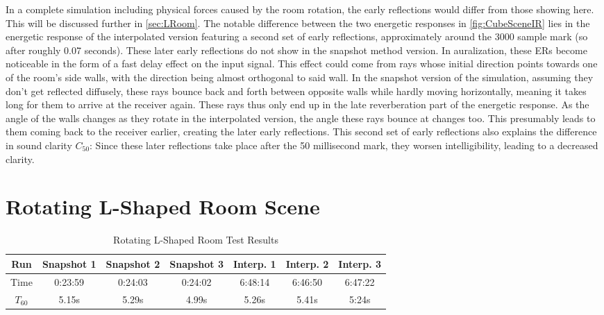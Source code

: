 In a complete simulation including physical forces caused by the room rotation,
the early reflections would differ from those showing here.
This will be discussed further in \autoref{sec:LRoom}.
\newline
The notable difference between the two energetic responses in \autoref{fig:CubeSceneIR}
lies in the energetic response of the interpolated version featuring a second set of early reflections,
approximately around the 3000 sample mark (so after roughly 0.07 seconds).
These later early reflections do not show in the snapshot method version.
In auralization, these ERs become noticeable in the form of a fast delay effect on the input signal.
\newline
This effect could come from rays whose initial direction points towards one of the room's side walls,
with the direction being almost orthogonal to said wall.
In the snapshot version of the simulation, assuming they don't get reflected diffusely,
these rays bounce back and forth between opposite walls while hardly moving horizontally,
meaning it takes long for them to arrive at the receiver again.
These rays thus only end up in the late reverberation part of the energetic response.
\newline
As the angle of the walls changes as they rotate in the interpolated version,
the angle these rays bounce at changes too.
This presumably leads to them coming back to the receiver earlier, creating the later early reflections.
\newline
This second set of early reflections also explains the difference in sound clarity \(C_{50}\):
Since these later reflections take place after the 50 millisecond mark,
they worsen intelligibility, leading to a decreased clarity.

\section{Rotating L-Shaped Room Scene}\label{sec:LRoom}

\begin{table}[t!]
    \centering
    \begin{tabular}{| c | c | c | c | c | c | c |}
        \hline
        Run        & Snapshot 1 & Snapshot 2 & Snapshot 3 & Interp. 1 & Interp. 2 & Interp. 3 \\
        \hline
        Time       & 0:23:59    & 0:24:03    & 0:24:02    & 6:48:14   & 6:46:50   & 6:47:22   \\
        \hline
        \(T_{60}\) & 5.15s      & 5.29s      & 4.99s      & 5.26s     & 5.41s     & 5:24s     \\
        \hline
    \end{tabular}
    \caption{Rotating L-Shaped Room Test Results}\label{tbl:LSceneTable}
\end{table}

